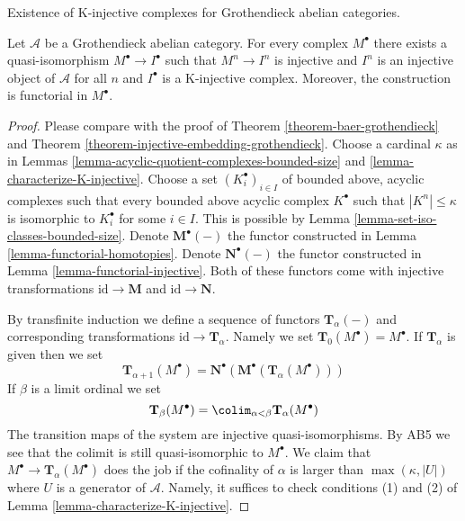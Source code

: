 \begin{theorem}
\label{theorem-K-injective-embedding-grothendieck}
\begin{slogan}
Existence of K-injective complexes for Grothendieck abelian categories.
\end{slogan}
Let $\mathcal{A}$ be a Grothendieck abelian category.
For every complex $M^\bullet$ there exists a quasi-isomorphism
$M^\bullet \to I^\bullet$ such that $M^n \to I^n$ is injective and $I^n$
is an injective object of $\mathcal{A}$ for all $n$ and $I^\bullet$
is a K-injective complex. Moreover, the construction is functorial in
$M^\bullet$.
\end{theorem}

\begin{proof}
Please compare with the proof of
Theorem \ref{theorem-baer-grothendieck}
and
Theorem \ref{theorem-injective-embedding-grothendieck}.
Choose a cardinal $\kappa$ as in
Lemmas \ref{lemma-acyclic-quotient-complexes-bounded-size} and
\ref{lemma-characterize-K-injective}.
Choose a set $(K_i^\bullet)_{i \in I}$
of bounded above, acyclic complexes
such that every bounded above acyclic complex $K^\bullet$
such that $|K^n| \leq \kappa$ is isomorphic to $K_i^\bullet$ for some
$i \in I$. This is possible by
Lemma \ref{lemma-set-iso-classes-bounded-size}.
Denote $\mathbf{M}^\bullet(-)$ the functor constructed in
Lemma \ref{lemma-functorial-homotopies}.
Denote $\mathbf{N}^\bullet(-)$ the functor constructed in
Lemma \ref{lemma-functorial-injective}.
Both of these functors come with injective transformations
$\text{id} \to \mathbf{M}$ and $\text{id} \to \mathbf{N}$.

\medskip\noindent
By transfinite induction we define a sequence of functors
$\mathbf{T}_\alpha(-)$ and corresponding transformations
$\text{id} \to \mathbf{T}_\alpha$. Namely we set
$\mathbf{T}_0(M^\bullet) = M^\bullet$. If $\mathbf{T}_\alpha$ is
given then we set
$$
\mathbf{T}_{\alpha + 1}(M^\bullet) =
\mathbf{N}^\bullet(\mathbf{M}^\bullet(\mathbf{T}_\alpha(M^\bullet)))
$$
If $\beta$ is a limit ordinal we set
$$
\mathbf{T}_\beta(M^\bullet) =
\colim_{\alpha < \beta} \mathbf{T}_\alpha(M^\bullet)
$$
The transition maps of the system are injective quasi-isomorphisms.
By AB5 we see that the colimit is still quasi-isomorphic to $M^\bullet$.
We claim that $M^\bullet \to \mathbf{T}_\alpha(M^\bullet)$
does the job if the cofinality of $\alpha$ is larger than
$\max(\kappa, |U|)$ where $U$ is a generator of $\mathcal{A}$.
Namely, it suffices to check conditions (1) and (2) of
Lemma \ref{lemma-characterize-K-injective}.


\end{proof}
